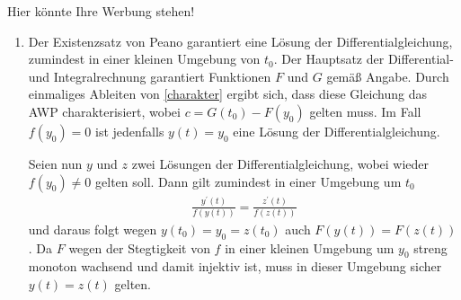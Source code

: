 \begin{solution}
    Hier könnte Ihre Werbung stehen!
    \begin{enumerate}[label = \alph*)]
        \item Der Existenzsatz von Peano garantiert eine Lösung der Differentialgleichung, zumindest in einer kleinen Umgebung von $t_0$. Der Hauptsatz der Differential- und Integralrechnung garantiert Funktionen $F$ und $G$ gemäß Angabe. Durch einmaliges Ableiten von \eqref{charakter} ergibt sich, dass diese Gleichung das AWP charakterisiert, wobei $c = G(t_0) - F(y_0)$ gelten muss. Im Fall $f(y_0) = 0$ ist jedenfalls $y(t) = y_0$ eine Lösung der Differentialgleichung.
        
        Seien nun $y$ und $z$ zwei Lösungen der Differentialgleichung, wobei wieder $f(y_0) \neq 0$ gelten soll. Dann gilt zumindest in einer Umgebung um $t_0$
        \begin{align*}
            \frac{y^\prime(t)}{f(y(t))} = \frac{z^\prime(t)}{f(z(t))}
        \end{align*}
        und daraus folgt wegen $y(t_0) = y_0 = z(t_0)$ auch $F(y(t)) = F(z(t))$. Da $F$ wegen der Stegtigkeit von $f$ in einer kleinen Umgebung um $y_0$ streng monoton wachsend und damit injektiv ist, muss in dieser Umgebung sicher $y(t) = z(t)$ gelten.
        

\end{enumerate}
\end{solution}
